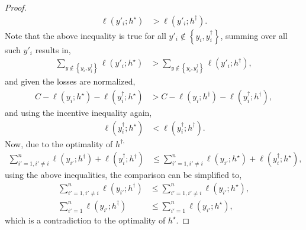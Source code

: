 \documentclass{article}
\begin{document}
\begin{proof}
\begin{align*}
\ell\left(y'_{i} ; h^\star \right) &> \ell\left(y'_{i} ; h^{\dagger}\right).
\end{align*}
Note that the above inequality is true for all $y'_{i} \notin \left\{y_{i}, y^{\dagger}_{i}\right\}$, summing over all such $y'_{i}$ results in,
\begin{align*}
\displaystyle\sum_{y \notin \left\{y_{i}, y^{\dagger}_{i}\right\}} \ell\left(y'_{i} ; h^\star \right) &> \displaystyle\sum_{y \notin \left\{y_{i}, y^{\dagger}_{i}\right\}} \ell\left(y'_{i} ; h^{\dagger}\right),
\end{align*}
and given the losses are normalized,
\begin{align*}
C  - \ell\left(y_{i} ; h^\star \right) - \ell\left(y^{\dagger}_{i} ; h^\star \right) &> C  - \ell\left(y_{i} ; h^{\dagger}\right) - \ell\left(y^{\dagger}_{i} ; h^{\dagger}\right),
\end{align*}
and using the incentive inequality again,
\begin{align*}
\ell\left(y^{\dagger}_{i} ; h^\star \right) &< \ell\left(y^{\dagger}_{i} ; h^{\dagger}\right).
\end{align*}
Now, due to the optimality of $h^{\dagger,}$
\begin{align*}
\displaystyle\sum_{i'=1, i' \neq  i}^{n} \ell\left(y_{i'} ; h^{\dagger}\right) + \ell\left(y^{\dagger}_{i} ; h^{\dagger}\right) &\leq  \displaystyle\sum_{i'=1, i' \neq  i}^{n} \ell\left(y_{i'} ; h^\star \right) + \ell\left(y^{\dagger}_{i} ; h^\star \right),
\end{align*}
using the above inequalities, the comparison can be simplified to,
\begin{align*}
\displaystyle\sum_{i'=1, i' \neq  i}^{n} \ell\left(y_{i'} ; h^{\dagger}\right) &\leq  \displaystyle\sum_{i'=1, i' \neq  i}^{n} \ell\left(y_{i'} ; h^\star \right),
\\ \displaystyle\sum_{i'=1}^{n} \ell\left(y_{i'} ; h^{\dagger}\right) &\leq  \displaystyle\sum_{i'=1}^{n} \ell\left(y_{i'} ; h^\star \right),
\end{align*}
which is a contradiction to the optimality of $h^\star $.
\newline \newline\end{proof}


\end{document}
